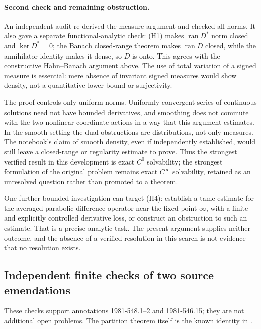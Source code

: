 \paragraph{Second check and remaining obstruction.}
An independent audit re-derived the measure argument and checked all norms.
It also gave a separate functional-analytic check: (H1) makes
\(\operatorname{ran}D^*\) norm closed and \(\ker D^*=0\); the Banach
closed-range theorem makes \(\operatorname{ran}D\) closed, while the
annihilator identity makes it dense, so \(D\) is onto. This agrees with
the constructive Hahn--Banach argument above. The use of total variation
of a signed measure is essential: mere absence of invariant signed
measures would show density, not a quantitative lower bound or
surjectivity.

The proof controls only uniform norms. Uniformly convergent series of
continuous solutions need not have bounded derivatives, and smoothing
does not commute with the two nonlinear coordinate actions in a way that
this argument estimates. In the smooth setting the dual obstructions are
distributions, not only measures. The notebook's claim of smooth density,
even if independently established, would still leave a closed-range or
regularity estimate to prove. Thus the strongest verified result in this
development is exact \(C^0\) solvability; the strongest formulation of the
original problem remains exact \(C^\infty\) solvability, retained as an
unresolved question rather than promoted to a theorem.

One further bounded investigation can target (H4): establish a tame
estimate for the averaged parabolic difference operator near the fixed
point \(\infty\), with a finite and explicitly controlled derivative
loss, or construct an obstruction to such an estimate. That is a precise
analytic task. The present argument supplies neither outcome, and the
absence of a verified resolution in this search is not evidence that no
resolution exists.

\subsection{Independent finite checks of two source emendations}

These checks support annotations 1981-548.1--2 and 1981-546.15; they are not
additional open problems. The partition theorem itself is the known identity
in \citet[Chapter I, Section 1, (1.7)--(1.7')]{macdonald1995symmetric}.

